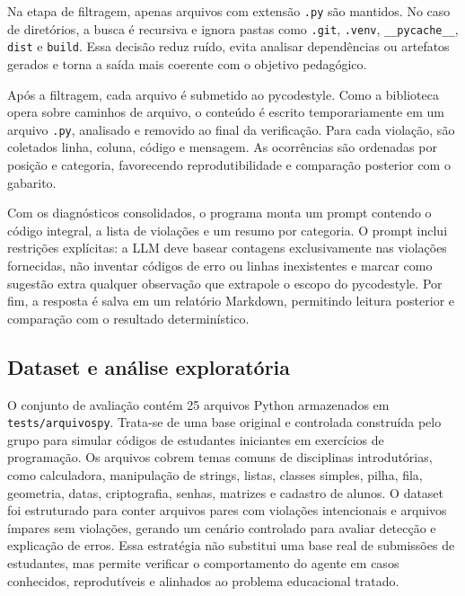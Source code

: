 \documentclass[12pt]{article}
\begin{document}
Na etapa de filtragem, apenas arquivos com extensão \texttt{.py} são mantidos.
No caso de diretórios, a busca é recursiva e ignora pastas como \texttt{.git},
\texttt{.venv}, \texttt{\_\_pycache\_\_}, \texttt{dist} e \texttt{build}. Essa
decisão reduz ruído, evita analisar dependências ou artefatos gerados e torna a
saída mais coerente com o objetivo pedagógico.

Após a filtragem, cada arquivo é submetido ao pycodestyle. Como a
biblioteca opera sobre caminhos de arquivo, o conteúdo é escrito
temporariamente em um arquivo \texttt{.py}, analisado e removido ao final da
verificação. Para cada violação, são coletados linha, coluna, código e mensagem.
As ocorrências são ordenadas por posição e categoria, favorecendo
reprodutibilidade e comparação posterior com o gabarito.

Com os diagnósticos consolidados, o programa monta um prompt contendo o código
integral, a lista de violações e um resumo por categoria. O prompt inclui
restrições explícitas: a LLM deve basear contagens exclusivamente nas violações
fornecidas, não inventar códigos de erro ou linhas inexistentes e marcar como
sugestão extra qualquer observação que extrapole o escopo do
pycodestyle. Por fim, a resposta é salva em um relatório
Markdown, permitindo leitura posterior e comparação com o resultado
determinístico.

\subsection{Dataset e análise exploratória}

O conjunto de avaliação contém 25 arquivos Python armazenados em
\texttt{tests/arquivospy}. Trata-se de uma base original e controlada construída
pelo grupo para simular códigos de estudantes iniciantes em exercícios de
programação. Os arquivos cobrem temas comuns de disciplinas introdutórias, como
calculadora, manipulação de strings, listas, classes simples, pilha, fila,
geometria, datas, criptografia, senhas, matrizes e cadastro de alunos. O
dataset foi estruturado para conter arquivos pares com violações intencionais e
arquivos ímpares sem violações, gerando um cenário controlado para avaliar
detecção e explicação de erros. Essa estratégia não substitui uma base real de
submissões de estudantes, mas permite verificar o comportamento do agente em
casos conhecidos, reprodutíveis e alinhados ao problema educacional tratado.
\end{document}
